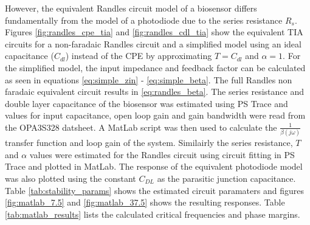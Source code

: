However, the equivalent Randles circuit model of a biosensor differs fundamentally from the model of a photodiode due to the series resistance $R_s$. Figures \ref{fig:randles_cpe_tia} and \ref{fig:randles_cdl_tia} show the equivalent TIA circuits for a non-faradaic Randles circuit and a simplified model using an ideal capacitance ($C_{dl}$) instead of the \ac{CPE} by approximating $T=C_{dl}$ and $\alpha=1$. For the simplified model, the input impedance and feedback factor can be calculated as seen in equations \ref{eq:simple_zin} - \ref{eq:simple_beta}. The full Randles non faradaic equivalent circuit results in \ref{eq:randles_beta}. The series resistance and double layer capacitance of the biosensor was estimated using PS Trace and values for input capacitance, open loop gain and gain bandwidth were read from the OPA3S328 datsheet. A MatLab script was then used to calculate the $\frac{1}{\beta(j\omega)}$ transfer function and loop gain of the system. Similairly the series resistance, $T$ and $\alpha$ values were estimated for the Randles circuit using circuit fitting in PS Trace and plotted in MatLab. The response of the equivalent photodiode model was also plotted using the constant $C_{DL}$ as the parasitic junction capacitance. Table \ref{tab:stability_params} shows the estimated circuit paramaters and figures \ref{fig:matlab_7.5} and \ref{fig:matlab_37.5} shows the resulting responses. Table \ref{tab:matlab_results} lists the calculated critical frequencies and phase margins.

